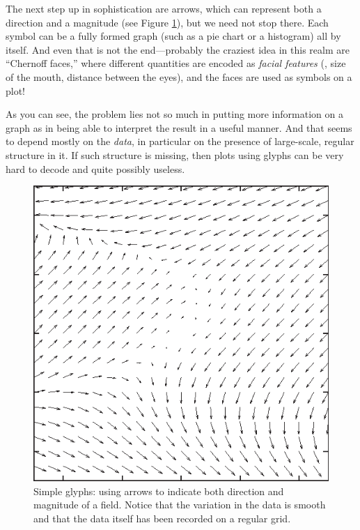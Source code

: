 The next step up in sophistication are arrows, which can represent
both a direction and a magnitude (see Figure \ref{fig:vectorplot}), but
we need not stop there. Each symbol can be a fully formed graph (such
as a pie chart or a histogram) all by itself. And even that is not the
end---probably the craziest idea in this realm are ``Chernoff faces,''
where different quantities are encoded as \emph{facial features} (\eg,
size of the mouth, distance between the eyes), and the faces are used
as symbols on a plot!

As you can see, the problem lies not so much in putting more
information on a graph as in being able to interpret the result in a
useful manner. And that seems to depend mostly on the \emph{data}, in
particular on the presence of large-scale, regular structure in it.
If such structure is missing, then plots using glyphs can be very hard
to decode and quite possibly useless.

\begin{figure}
  \centerline{\includegraphics{img/vectorplot}}
  \caption{Simple glyphs: using arrows to indicate both direction and
    magnitude of a field. Notice that the variation in the data is
    smooth and that the data itself has been recorded on a regular
    grid.}
  \label{fig:vectorplot}\vspace*{-6pt}
\end{figure}

